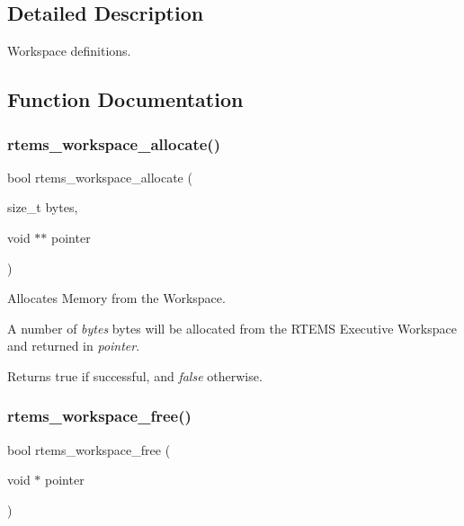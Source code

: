 \subsection{Detailed Description}
Workspace definitions. 

\subsection{Function Documentation}
\mbox{\label{group__ClassicRTEMSWorkspace_ga64ef053b5f7b0b526c024b2596a24dfb}} 
\subsubsection{\texorpdfstring{rtems\_workspace\_allocate()}{rtems\_workspace\_allocate()}}
{\footnotesize\ttfamily bool rtems\+\_\+workspace\+\_\+allocate (\begin{DoxyParamCaption}\item[{size\+\_\+t}]{bytes,  }\item[{void $\ast$$\ast$}]{pointer }\end{DoxyParamCaption})}



Allocates Memory from the Workspace. 

A number of {\itshape bytes} bytes will be allocated from the R\+T\+E\+MS Executive Workspace and returned in {\itshape pointer}.

Returns {\ttfamily true} if successful, and {\itshape false} otherwise. \mbox{\label{group__ClassicRTEMSWorkspace_ga81fe88352cd9de960f78a48aa6d33f48}} 
\subsubsection{\texorpdfstring{rtems\_workspace\_free()}{rtems\_workspace\_free()}}
{\footnotesize\ttfamily bool rtems\+\_\+workspace\+\_\+free (\begin{DoxyParamCaption}\item[{void $\ast$}]{pointer }\end{DoxyParamCaption})}




